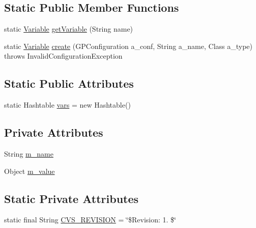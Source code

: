 \subsection*{Static Public Member Functions}
\begin{DoxyCompactItemize}
\item 
static \hyperlink{classorg_1_1jgap_1_1gp_1_1terminal_1_1_variable}{Variable} \hyperlink{classorg_1_1jgap_1_1gp_1_1terminal_1_1_variable_a66e60ca28295f4b1bdaa6a0208314d68}{get\-Variable} (String name)
\item 
static \hyperlink{classorg_1_1jgap_1_1gp_1_1terminal_1_1_variable}{Variable} \hyperlink{classorg_1_1jgap_1_1gp_1_1terminal_1_1_variable_a13e7916bcc136cf1505a2e9d132ffeab}{create} (G\-P\-Configuration a\-\_\-conf, String a\-\_\-name, Class a\-\_\-type)  throws Invalid\-Configuration\-Exception 
\end{DoxyCompactItemize}
\subsection*{Static Public Attributes}
\begin{DoxyCompactItemize}
\item 
static Hashtable \hyperlink{classorg_1_1jgap_1_1gp_1_1terminal_1_1_variable_a0769a63a84719d7d8cca630ea4b902d0}{vars} = new Hashtable()
\end{DoxyCompactItemize}
\subsection*{Private Attributes}
\begin{DoxyCompactItemize}
\item 
String \hyperlink{classorg_1_1jgap_1_1gp_1_1terminal_1_1_variable_a9819f32565614b3b60997fbba51374f9}{m\-\_\-name}
\item 
Object \hyperlink{classorg_1_1jgap_1_1gp_1_1terminal_1_1_variable_a523186af0a38d1e5dbe8e154be2915e9}{m\-\_\-value}
\end{DoxyCompactItemize}
\subsection*{Static Private Attributes}
\begin{DoxyCompactItemize}
\item 
static final String \hyperlink{classorg_1_1jgap_1_1gp_1_1terminal_1_1_variable_adb38a50039f85ec2dfc3ffae9cb8c50b}{C\-V\-S\-\_\-\-R\-E\-V\-I\-S\-I\-O\-N} = \char`\"{}\$Revision\-: 1. \$\char`\"{}
\end{DoxyCompactItemize}
